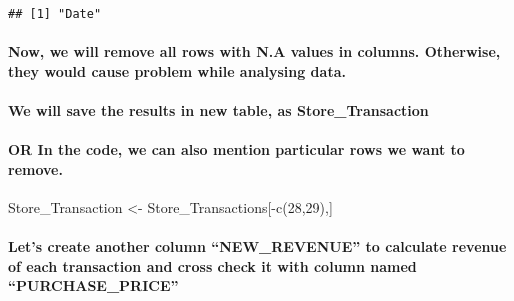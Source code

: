 \documentclass[
]{article}
\newenvironment{Shaded}{\begin{snugshade}}{\end{snugshade}}
\newcommand{\DecValTok}[1]{\textcolor[rgb]{0.00,0.00,0.81}{#1}}
\newcommand{\FunctionTok}[1]{\textcolor[rgb]{0.00,0.00,0.00}{#1}}
\newcommand{\NormalTok}[1]{#1}
\newcommand{\OtherTok}[1]{\textcolor[rgb]{0.56,0.35,0.01}{#1}}
\newcommand{\SpecialCharTok}[1]{\textcolor[rgb]{0.00,0.00,0.00}{#1}}
\begin{document}
\begin{verbatim}
## [1] "Date"
\end{verbatim}

\hypertarget{now-we-will-remove-all-rows-with-n.a-values-in-columns.-otherwise-they-would-cause-problem-while-analysing-data.}{%
\paragraph{Now, we will remove all rows with N.A values in columns.
Otherwise, they would cause problem while analysing
data.}\label{now-we-will-remove-all-rows-with-n.a-values-in-columns.-otherwise-they-would-cause-problem-while-analysing-data.}}

\hypertarget{we-will-save-the-results-in-new-table-as-store_transaction}{%
\paragraph{We will save the results in new table, as
Store\_Transaction}\label{we-will-save-the-results-in-new-table-as-store_transaction}}

\begin{Shaded}
\end{Shaded}

\hypertarget{or-in-the-code-we-can-also-mention-particular-rows-we-want-to-remove.}{%
\paragraph{OR In the code, we can also mention particular rows we want
to
remove.}\label{or-in-the-code-we-can-also-mention-particular-rows-we-want-to-remove.}}

\begin{Shaded}
\begin{Highlighting}[]
\NormalTok{Store\_Transaction }\OtherTok{\textless{}{-}}\NormalTok{ Store\_Transactions[}\SpecialCharTok{{-}}\FunctionTok{c}\NormalTok{(}\DecValTok{28}\NormalTok{,}\DecValTok{29}\NormalTok{),]}
\end{Highlighting}
\end{Shaded}

\hypertarget{lets-create-another-column-new_revenue-to-calculate-revenue-of-each-transaction-and-cross-check-it-with-column-named-purchase_price}{%
\paragraph{Let's create another column ``NEW\_REVENUE'' to calculate
revenue of each transaction and cross check it with column named
``PURCHASE\_PRICE''}\label{lets-create-another-column-new_revenue-to-calculate-revenue-of-each-transaction-and-cross-check-it-with-column-named-purchase_price}}
\end{document}
